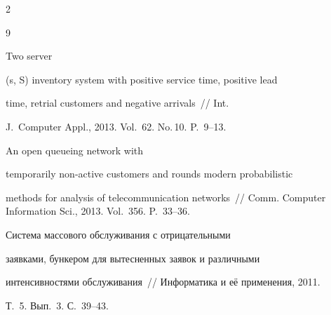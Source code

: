 \begin{multicols}{2}
{{\begin{thebibliography}{9}


 Two server


(s, S) inventory system with positive service time, positive lead


time, retrial customers and negative arrivals~// Int.


J.~Computer Appl., 2013. Vol.~62. No.\,10. P.~9--13.







 An open queueing network with


temporarily non-active customers and rounds modern probabilistic


methods for analysis of telecommunication networks~// Comm. Computer Information Sci., 2013. Vol.~356. P.~33--36.











\label{end\stat}







 Система массового обслуживания с отрицательными


заявками, бункером для вытесненных заявок и различными


интенсивностями обслуживания~// Информатика и её применения, 2011.


Т.~5. Вып.~3. С.~39--43.


\end{thebibliography}


}


}





\end{multicols}


